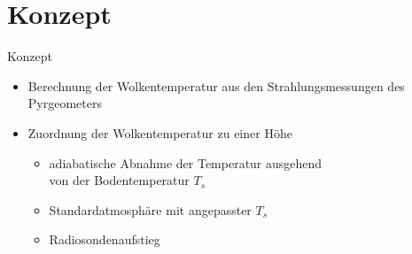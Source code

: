 \documentclass{beamer}
\begin{document}
\section{Konzept}
\begin{frame}{Konzept}
\begin{itemize}
  \vfill\item Berechnung der Wolkentemperatur aus den Strahlungsmessungen des
      Pyrgeometers
  \vfill\item Zuordnung der Wolkentemperatur zu einer Höhe
  \begin{itemize}
    \item adiabatische Abnahme der Temperatur ausgehend\\
          von der Bodentemperatur $T_s$
    \item Standardatmosphäre mit angepasster $T_s$
    \item Radiosondenaufstieg
  \end{itemize}
  \vfill
\end{itemize}
\end{frame}
\end{document}

